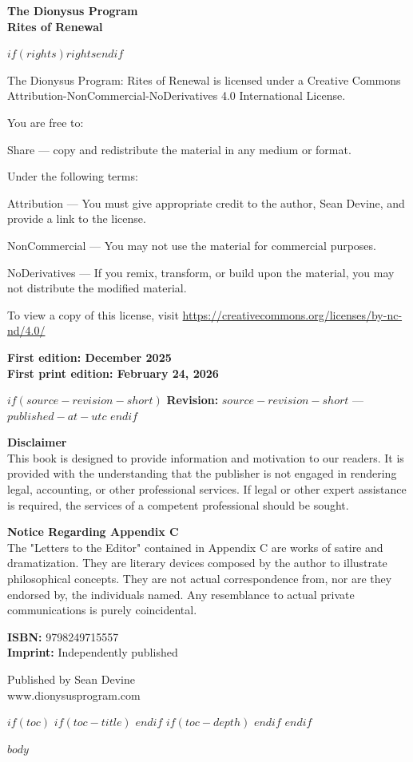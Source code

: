 \documentclass[10pt,twoside]{article}
\begin{document}
\clearpage
\thispagestyle{empty}
{\small
\raggedright
\textbf{The Dionysus Program}\\
\textbf{Rites of Renewal}

$if(rights)$$rights$$endif$

The Dionysus Program: Rites of Renewal is licensed under a Creative Commons Attribution-NonCommercial-NoDerivatives 4.0 International License.

You are free to:

Share — copy and redistribute the material in any medium or format.

Under the following terms:

Attribution — You must give appropriate credit to the author, Sean Devine, and provide a link to the license.

NonCommercial — You may not use the material for commercial purposes.

NoDerivatives — If you remix, transform, or build upon the material, you may not distribute the modified material.

To view a copy of this license, visit \url{https://creativecommons.org/licenses/by-nc-nd/4.0/}

\textbf{First edition: December 2025}\\
\textbf{First print edition: February 24, 2026}

$if(source-revision-short)$
\textbf{Revision:} \texttt{$source-revision-short$} --- $published-at-utc$
$endif$

\textbf{Disclaimer}\\
This book is designed to provide information and motivation to our readers. It is provided with the understanding that the publisher is not engaged in rendering legal, accounting, or other professional services. If legal or other expert assistance is required, the services of a competent professional should be sought.

\textbf{Notice Regarding Appendix C}\\
The "Letters to the Editor" contained in Appendix C are works of satire and dramatization. They are literary devices composed by the author to illustrate philosophical concepts. They are not actual correspondence from, nor are they endorsed by, the individuals named. Any resemblance to actual private communications is purely coincidental.

\textbf{ISBN:} 9798249715557\\
\textbf{Imprint:} Independently published

Published by Sean Devine\\
www.dionysusprogram.com
}
\clearpage

\setcounter{page}{1}

$if(toc)$
  $if(toc-title)$
    \renewcommand{\contentsname}{$toc-title$}
  $endif$
  $if(toc-depth)$
    \setcounter{tocdepth}{$toc-depth$}
  $endif$
  \tableofcontents
  \newpage
$endif$

$body$
\end{document}
